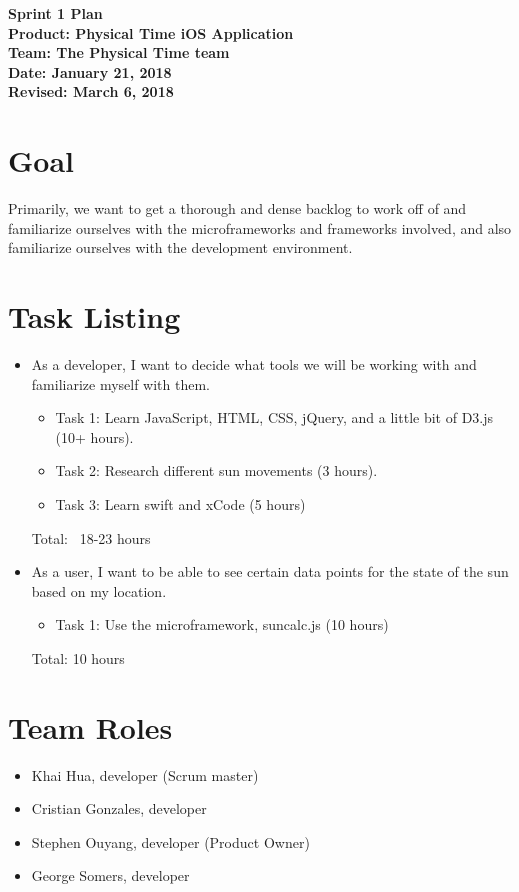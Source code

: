 \documentclass[11pt]{article}
\newcommand\tab[1][1cm]{\hspace*{#1}}
\begin{document}
	\Large{\textbf{Sprint 1 Plan}}\\
	\Large{\textbf{Product: Physical Time iOS Application}}\\
	\Large{\textbf{Team: The Physical Time team}}\\
	\Large{\textbf{Date: January 21, 2018}}\\
	\Large{\textbf{Revised: March 6, 2018}}\\
	
	\vspace{-3mm}
	
	\section{Goal}
		\vspace{-3mm}
		\tab \normalsize{Primarily, we want to get a thorough and dense backlog to work off of and familiarize ourselves with the microframeworks and frameworks involved, and also familiarize ourselves with the development environment.}
		
	\section{Task Listing}
		\vspace{-3mm}
		\begin{itemize}
			\item As a developer, I want to decide what tools we will be working with and familiarize myself with them.
			\begin{itemize}
			    \item Task 1: Learn JavaScript, HTML, CSS, jQuery, and a little bit of D3.js (10+ hours).
			    \item Task 2: Research different sun movements (3 hours).
			    \item Task 3: Learn swift and xCode (5 hours)
			\end{itemize}
			Total: ~18-23 hours
			\item As a user, I want to be able to see certain data points for the state of the sun based on my location.
			\begin{itemize}
			    \item Task 1: Use the microframework, suncalc.js (10 hours)
			\end{itemize}
			Total: 10 hours
		\end{itemize}
		
	\section{Team Roles}
		\vspace{-3mm}
		\begin{itemize}
		    \item Khai Hua, developer (Scrum master)
		    \item Cristian Gonzales, developer
		    \item Stephen Ouyang, developer (Product Owner)
		    \item George Somers, developer
		\end{itemize}
\end{document}
